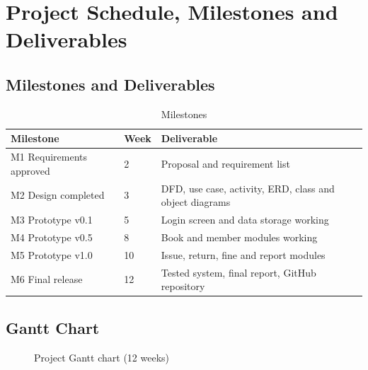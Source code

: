 \documentclass[12pt,a4paper]{article}
\begin{document}
\section{Project Schedule, Milestones and Deliverables}\label{sec:schedule}
\subsection{Milestones and Deliverables}
\begin{table}[H]\centering\small\begin{tabular}{@{}llp{}@{}}\toprule Milestone & Week & Deliverable \\ \midrule
M1 Requirements approved & 2 & Proposal and requirement list \\
M2 Design completed & 3 & DFD, use case, activity, ERD, class and object diagrams \\
M3 Prototype v0.1 & 5 & Login screen and data storage working \\
M4 Prototype v0.5 & 8 & Book and member modules working \\
M5 Prototype v1.0 & 10 & Issue, return, fine and report modules \\
M6 Final release & 12 & Tested system, final report, GitHub repository \\ \bottomrule\end{tabular}\caption{Milestones}\end{table}

\subsection{Gantt Chart}
\begin{figure}[H]\centering
{}
\caption{Project Gantt chart (12 weeks)}\end{figure}
\end{document}
